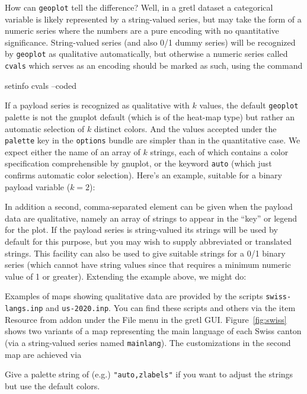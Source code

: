 \documentclass{article}
\begin{document}
How can \texttt{geoplot} tell the difference? Well, in a gretl dataset
a categorical variable is likely represented by a string-valued
series, but may take the form of a numeric series where the numbers
are a pure encoding with no quantitative significance. String-valued
series (and also 0/1 dummy series) will be recognized by
\texttt{geoplot} as qualitative automatically, but otherwise a numeric
series called \texttt{cvals} which serves as an encoding should be
marked as such, using the command
\begin{code}
setinfo cvals --coded
\end{code}
If a payload series is recognized as qualitative with $k$ values, the
default \texttt{geoplot} palette is not the gnuplot default (which is
of the heat-map type) but rather an automatic selection of $k$
distinct colors. And the values accepted under the \texttt{palette}
key in the \texttt{options} bundle are simpler than in the
quantitative case. We expect either the name of an array of $k$
strings, each of which contains a color specification comprehensible
by \textsf{gnuplot}, or the keyword \texttt{auto} (which just confirms
automatic color selection). Here's an example, suitable for a binary
payload variable ($k=2$):
In addition a second, comma-separated element can be given when the
payload data are qualitative, namely an array of strings to appear in
the ``key'' or legend for the plot. If the payload series is
string-valued its strings will be used by default for this purpose,
but you may wish to supply abbreviated or translated strings. This
facility can also be used to give suitable strings for a 0/1 binary
series (which cannot have string values since that requires a minimum
numeric value of 1 or greater). Extending the example above, we might
do:

Examples of maps showing qualitative data are provided by the scripts
\texttt{swiss-langs.inp} and \texttt{us-2020.inp}. You can find these
scripts and others via the item \textsf{Resource from addon} under the
\textsf{File} menu in the gretl GUI. Figure~\ref{fig:swiss} shows two
variants of a map representing the main language of each Swiss canton
(via a string-valued series named \texttt{mainlang}). The
customizations in the second map are achieved via
Give a palette string of (e.g.) \verb|"auto,zlabels"| if you want to
adjust the strings but use the default colors.
\end{document}
